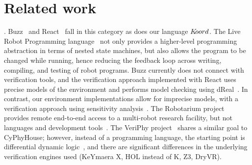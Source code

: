     \section{Related work}
    \label{sec:related}
    . 
%
Buzz~\cite{Buzzlanguage} and React~\cite{reactlang} fall in this category as does our language $K\kern-2pt oord$. 
The Live Robot Programming language~\cite{campusanofabry:lrp2016} not only provides a higher-level programming abstraction in terms of nested state machines, but also allows the program to be changed while running, hence reducing the feedback loop across writing, compiling, and testing of robot programs. 
Buzz currently does not  connect with  verification tools, and the verification approach implemented with React uses precise models of the environment and performs model checking using dReal~\cite{Gao2013}. 
In contrast, our environment implementations allow for imprecise models, with a verification approach using sensitivity analysis~\cite{DryVR2017}.
%
%
%
%
The Robotarium project provides remote end-to-end access to a  multi-robot research facility, but not languages and development tools~\cite{robotarium}. 
The  VeriPhy project~\cite{Bohrer:2018:VVC:3192366.3192406} shares a similar goal to CyPhyHouse; however, instead of a programming language, the starting point is differential dynamic logic~\cite{Bohrer:2017:FVD:3018610.3018616},  and there are significant differences  in the underlying verification engines used (KeYmaera X, HOL instead of K, Z3, DryVR).
%

